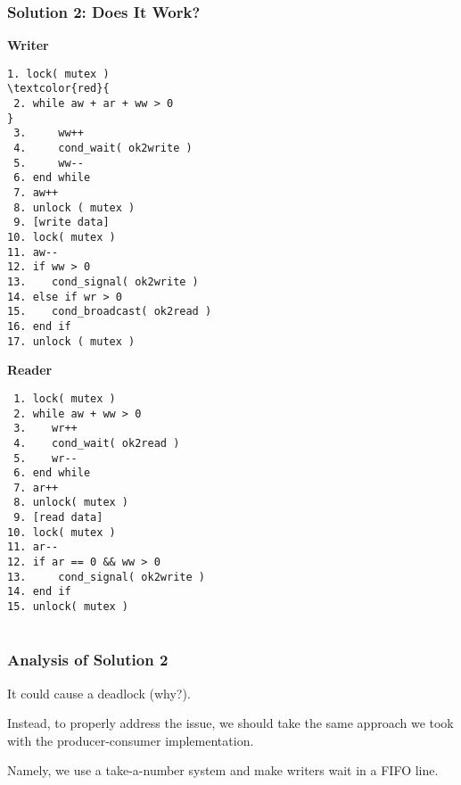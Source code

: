 \begin{frame}[fragile]
	\frametitle{Solution 2: Does It Work?}

	\begin{multicols}{2}
		\small
		\textbf{Writer}
		\begin{Verbatim}[commandchars=\\\{\}]
 1. lock( mutex )
\textcolor{red}{
 2. while aw + ar + ww > 0
}
 3.     ww++
 4.     cond_wait( ok2write )
 5.     ww--
 6. end while
 7. aw++
 8. unlock ( mutex )
 9. [write data]
10. lock( mutex )
11. aw--
12. if ww > 0
13.    cond_signal( ok2write )
14. else if wr > 0
15.    cond_broadcast( ok2read )
16. end if
17. unlock ( mutex )
		\end{Verbatim}
		\columnbreak
		\textbf{Reader}
		\begin{verbatim}
 1. lock( mutex )
 2. while aw + ww > 0
 3.    wr++
 4.    cond_wait( ok2read )
 5.    wr--
 6. end while
 7. ar++
 8. unlock( mutex )
 9. [read data]
10. lock( mutex )
11. ar--
12. if ar == 0 && ww > 0
13.     cond_signal( ok2write )
14. end if
15. unlock( mutex )


		\end{verbatim}
	\end{multicols}
\end{frame}

\begin{frame}
	\frametitle{Analysis of Solution 2}

	It could cause a deadlock (why?).


	Instead, to properly address the issue, we should take the same approach we took with the producer-consumer implementation.

	Namely, we use a \alert{take-a-number} system and make writers wait in a FIFO line.

\end{frame}


